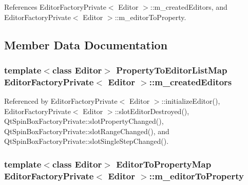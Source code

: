 References Editor\+Factory\+Private$<$ Editor $>$\+::m\+\_\+created\+Editors, and Editor\+Factory\+Private$<$ Editor $>$\+::m\+\_\+editor\+To\+Property.



\subsection{Member Data Documentation}
\subsubsection[{m\+\_\+created\+Editors}]{\setlength{\rightskip}{0pt plus 5cm}template$<$class Editor$>$ {\bf Property\+To\+Editor\+List\+Map} {\bf Editor\+Factory\+Private}$<$ Editor $>$\+::m\+\_\+created\+Editors}\label{classEditorFactoryPrivate_a3a19c3aa4d293883baa5e173b1a8ac84}


Referenced by Editor\+Factory\+Private$<$ Editor $>$\+::initialize\+Editor(), Editor\+Factory\+Private$<$ Editor $>$\+::slot\+Editor\+Destroyed(), Qt\+Spin\+Box\+Factory\+Private\+::slot\+Property\+Changed(), Qt\+Spin\+Box\+Factory\+Private\+::slot\+Range\+Changed(), and Qt\+Spin\+Box\+Factory\+Private\+::slot\+Single\+Step\+Changed().

\subsubsection[{m\+\_\+editor\+To\+Property}]{\setlength{\rightskip}{0pt plus 5cm}template$<$class Editor$>$ {\bf Editor\+To\+Property\+Map} {\bf Editor\+Factory\+Private}$<$ Editor $>$\+::m\+\_\+editor\+To\+Property}\label{classEditorFactoryPrivate_aea4909c0941661f99daad1a1476e38e7}


